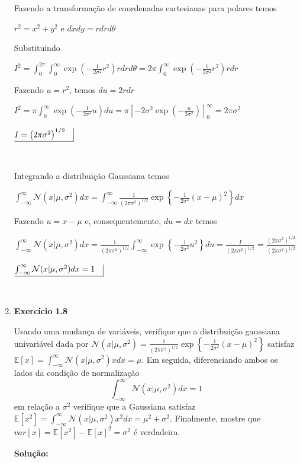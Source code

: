 \begin{enumerate}
Fazendo a transformação de coordenadas cartesianas para polares temos

$r^2 = x^2 + y^2$ e $dxdy = rdrd\theta$

Substituindo

$I^2 = \int_{0}^{2\pi}\int_{0}^{\infty}\exp\left(-\frac{1}{2\sigma^2}r^2 \right) r drd\theta =
2\pi\int_{0}^{\infty}\exp\left(-\frac{1}{2\sigma^2}r^2 \right) r dr$

Fazendo $u = r^2$, temos $du = 2 r dr$

$ I^2 = \pi\int_{0}^{\infty}\exp\left(-\frac{1}{2\sigma^2}u \right) du =
\pi \left[-2\sigma^2 \exp\left( -\frac{u}{2\sigma^2} \right)  \right]_0^\infty = 2\pi\sigma^2$

$ \underline{I = \left( 2\pi\sigma^2 \right)^{1/2} \quad} \vline$

$ $

Integrando a distribuição Gaussiana temos

$\int_{-\infty}^{\infty}\mathcal{N}(x | \mu, \sigma^2)dx = \int_{-\infty}^{\infty} \frac{1}{(2\pi\sigma^2)^{1/2}}\exp\left\{ -\frac{1}{2\sigma^2}(x - \mu)^2 \right\} dx$

Fazendo $u = x - \mu$ e, consequentemente, $du = dx$ temos

$\int_{-\infty}^{\infty}\mathcal{N}(x | \mu, \sigma^2)dx =\frac{1}{(2\pi\sigma^2)^{1/2}} \int_{-\infty}^{\infty} \exp\left\{ -\frac{1}{2\sigma^2}u^2 \right\} du =\frac{I}{(2\pi\sigma^2)^{1/2}} = \frac{{(2\pi\sigma^2)^{1/2}}}{(2\pi\sigma^2)^{1/2}} $

$\underline{\int_{-\infty}^{\infty}\mathcal{N}(x | \mu, \sigma^2)dx = 1 \quad} \vline $

$ $


\item \textbf{Exercício 1.8} \par

Usando uma mudança de variáveis, verifique que a distribuição gaussiana univariável dada por $\mathcal{N}(x | \mu, \sigma^2)= \frac{1}{(2\pi\sigma^2)^{1/2}}\exp\left\{ -\frac{1}{2\sigma^2}(x - \mu)^2 \right\}$ satisfaz $\mathbb{E}[x] = \int_{-\infty}^{\infty}\mathcal{N}(x | \mu, \sigma^2)x dx=\mu $. Em seguida, diferenciando ambos os lados da condição de normalização
\begin{equation*}
    \int_{-\infty}^{\infty}\mathcal{N}(x | \mu, \sigma^2)dx=1
\end{equation*}
em relação a $\sigma^2$ verifique que a Gaussiana satisfaz  $\mathbb{E}[x^2] = \int_{-\infty}^{\infty}\mathcal{N}(x | \mu, \sigma^2)x^2 dx=\mu^2+\sigma^2 $. Finalmente, mostre que $var[x]=\mathbb{E}[x^2]-\mathbb{E}[x]^2=\sigma^2$ é verdadeira. 
\newline \par
\textbf{Solução:}


\end{enumerate}
